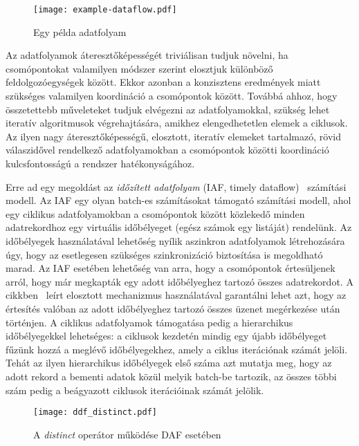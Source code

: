 \begin{figure}
	\centering
	\texttt{[image: example-dataflow.pdf]}
	\caption{Egy példa adatfolyam}
	\label{fig:example-dataflow}
\end{figure}

Az adatfolyamok áteresztőképességét triviálisan tudjuk növelni, ha csomópontokat valamilyen módszer szerint elosztjuk különböző feldolgozóegységek között. Ekkor azonban a konzisztens eredmények miatt szükséges valamilyen koordináció a csomópontok között. Továbbá ahhoz, hogy összetettebb műveleteket tudjuk elvégezni az adatfolyamokkal, szükség lehet iteratív algoritmusok végrehajtására, amikhez elengedhetetlen elemek a ciklusok. Az ilyen nagy áteresztőképességű, elosztott, iteratív elemeket tartalmazó, rövid válaszidővel rendelkező adatfolyamokban a csomópontok közötti koordináció kulcsfontosságú a rendszer hatékonyságához.

Erre ad egy megoldást az \emph{időzített adatfolyam} (IAF, timely dataflow)~\cite{DBLP:journals/cacm/MurrayMIIBA16} számítási modell. Az IAF egy olyan batch-es számításokat támogató számítási modell, ahol egy ciklikus adatfolyamokban a csomópontok között közlekedő minden adatrekordhoz egy virtuális időbélyeget (egész számok egy listáját) rendelünk. Az időbélyegek használatával lehetőség nyílik aszinkron adatfolyamok létrehozására úgy, hogy az esetlegesen szükséges szinkronizáció biztosítása is megoldható marad. Az IAF esetében lehetőség van arra, hogy a csomópontok értesüljenek arról, hogy már megkapták egy adott időbélyeghez tartozó összes adatrekordot. A cikkben~\cite{DBLP:journals/cacm/MurrayMIIBA16} leírt elosztott mechanizmus használatával garantálni lehet azt, hogy az értesítés valóban az adott időbélyeghez tartozó összes üzenet megérkezése után történjen. A ciklikus adatfolyamok támogatása pedig a hierarchikus időbélyegekkel lehetséges: a ciklusok kezdetén mindig egy újabb időbélyeget fűzünk hozzá a meglévő időbélyegekhez, amely a ciklus iterációnak számát jelöli. Tehát az ilyen hierarchikus időbélyegek első száma azt mutatja meg, hogy az adott rekord a bementi adatok közül melyik batch-be tartozik, az összes többi szám pedig a beágyazott ciklusok iterációinak számát jelölik.

\begin{figure}[ht]
	\centering
	\texttt{[image: ddf\_distinct.pdf]}
	\caption{A \emph{distinct} operátor működése DAF esetében}
	\label{fig:ddf_distinct}
\end{figure}

